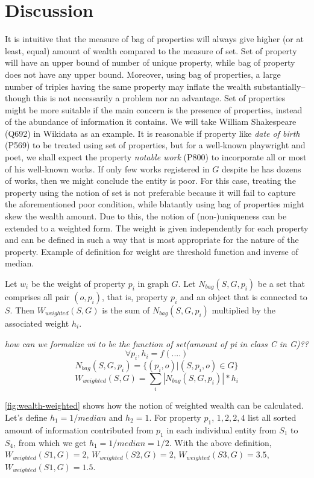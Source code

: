 \section{Discussion}


It is intuitive that the measure of bag of properties will always give higher (or at least, equal) amount of wealth compared to the measure of set. Set of property will have an upper bound of number of unique property, while bag of property does not have any upper bound. Moreover, using bag of properties, a large number of triples having the same property may inflate the wealth substantially--though this is not necessarily a problem nor an advantage. Set of properties might be more suitable if the main concern is the presence of properties, instead of the abundance of information it contains. We will take William Shakespeare (Q692) in Wikidata as an example. It is reasonable if property like  \textit{date of birth} (P569) to be treated using set of properties, but for a well-known playwright and poet, we shall expect the property \textit{notable work} (P800) to incorporate all or most of his well-known works. If only few works registered in \(G\) despite he has dozens of works, then we might conclude the entity is poor. For this case, treating the property using the notion of set is not preferable because it will fail to capture the aforementioned poor condition, while blatantly using bag of properties might skew the wealth amount. Due to this, the notion of (non-)uniqueness can be extended to a weighted form. The weight is given independently for each property and can be defined in such a way that is most appropriate for the nature of the property. Example of definition for weight are threshold function and inverse of median.

Let \(w_i\) be the weight of property \(p_i\) in graph \(G\). Let \(N_{bag}(S,G,p_i)\) be a set that comprises all pair  \((o,p_i)\), that is, property \(p_i\) and an object that is connected to \(S\). Then \(W_{weighted}(S, G)\) is the sum of \(N_{bag}(S,G,p_i)\) multiplied by the associated weight \(h_i\).

\textit{how can we formalize wi to be the function of set(amount of pi in class C in G)??}
\[
    \forall p_i, h_i = f(....)
\]
\[
    N_{bag}(S,G,p_i) = \{(p_i, o) | (S, p_i, o) \in G\}
\]
\[
    W_{weighted}(S, G) = \sum_i |N_{bag}(S,G,p_i)| * h_i
\]

\autoref{fig:wealth-weighted} shows how the notion of weighted wealth can be calculated. Let's define \(h_1 = 1/median\) and \(h_2 = 1\). For property \(p_1\), \({1, 2, 2, 4}\) list all sorted amount of information contributed from \(p_1\) in each individual entity from \(S_1\) to \(S_4\), from which we get \(h_1 = 1/median = 1/2\). With the above definition, \(W_{weighted}(S1, G) = 2\), \(W_{weighted}(S2, G) = 2\), \(W_{weighted}(S3, G) = 3.5\), \(W_{weighted}(S1, G) = 1.5\).

